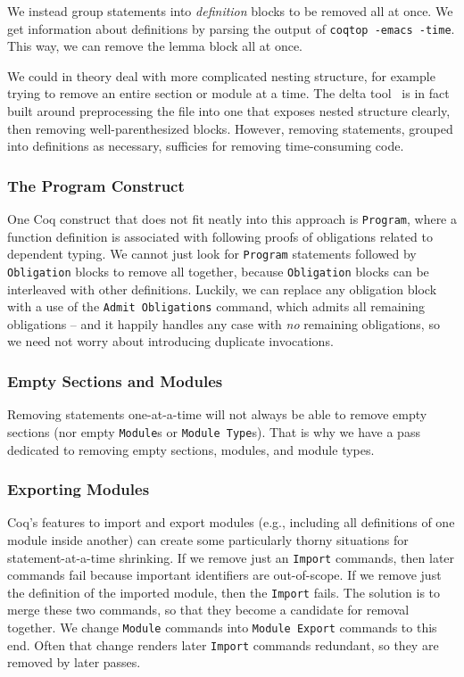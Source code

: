 \documentclass[a4paper,USenglish,cleveref,autoref,thm-restate]{lipics-v2021}
\begin{document}
We instead group statements into \emph{definition} blocks to be removed all at once.
We get information about definitions by parsing the output of \texttt{coqtop -emacs -time}.
This way, we can remove the lemma block all at once.

We could in theory deal with more complicated nesting structure, for example trying to remove an entire section or module at a time.
The delta tool~\cite{delta} is in fact built around preprocessing the file into one that exposes nested structure clearly, then removing well-parenthesized blocks.
However, removing statements, grouped into definitions as necessary, sufficies for removing time-consuming code.

\subsubsection{The Program Construct}
One Coq construct that does not fit neatly into this approach is \verb|Program|, where a function definition is associated with following proofs of obligations related to dependent typing.
We cannot just look for \verb|Program| statements followed by \verb|Obligation| blocks to remove all together, because \verb|Obligation| blocks can be interleaved with other definitions.
Luckily, we can replace any obligation block with a use of the \verb|Admit Obligations| command, which admits all remaining obligations -- and it happily handles any case with \emph{no} remaining obligations, so we need not worry about introducing duplicate invocations.

\subsubsection{Empty Sections and Modules}
Removing statements one-at-a-time will not always be able to remove empty sections (nor empty \verb|Module|s or \verb|Module Type|s).
That is why we have a pass dedicated to removing empty sections, modules, and module types.

\subsubsection{Exporting Modules}
Coq's features to import and export modules (e.g., including all definitions of one module inside another) can create some particularly thorny situations for statement-at-a-time shrinking.
If we remove just an \verb|Import| commands, then later commands fail because important identifiers are out-of-scope.
If we remove just the definition of the imported module, then the \verb|Import| fails.
The solution is to merge these two commands, so that they become a candidate for removal together.
We change \verb|Module| commands into \verb|Module Export| commands to this end.
Often that change renders later \verb|Import| commands redundant, so they are removed by later passes.
\end{document}
